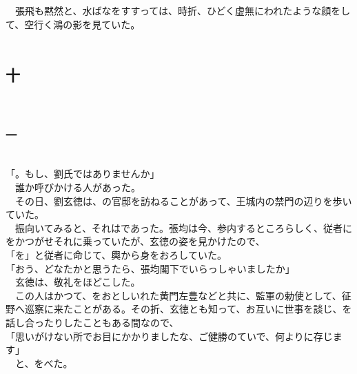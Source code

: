 \documentclass[
  paper=a5,
  fontsize=10pt,
  jafontsize=9.5pt,
  tate,                  %
  open_bracket_pos=nibu, %
]{jlreq}
\begin{document}
　張飛も黙然と、水ばなをすすっては、時折、ひどく虚無にわれたような顔をして、空行く鴻の影を見ていた。\\

\\

\subsection{十}

\\

\subsubsection{一}

\\


「。もし、劉氏ではありませんか」\\


　誰か呼びかける人があった。\\


　その日、劉玄徳は、の官邸を訪ねることがあって、王城内の禁門の辺りを歩いていた。\\


　振向いてみると、それはであった。張均は今、参内するところらしく、従者にをかつがせそれに乗っていたが、玄徳の姿を見かけたので、\\


「を」と従者に命じて、輿から身をおろしていた。\\


「おう、どなたかと思うたら、張均閣下でいらっしゃいましたか」\\


　玄徳は、敬礼をほどこした。\\


　この人はかつて、をおとしいれた黄門左豊などと共に、監軍の勅使として、征野へ巡察に来たことがある。その折、玄徳とも知って、お互いに世事を談じ、を話し合ったりしたこともある間なので、\\


「思いがけない所でお目にかかりましたな、ご健勝のていで、何よりに存じます」\\


　と、をべた。\\
\end{document}
